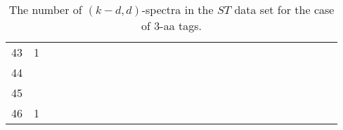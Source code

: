 \documentclass{article}
\begin{document}
\begin{table}[h]
{\begin{tabular}{|c|c|
c|c|c|c|c|c|c|c|c|c|c|c|c|c|c|c|c|c|c|c|c|c|c|c|c|c|}
43  & 1 &  &  &  &  &  &  &  &  &  &  &  &  &  &  &  &  &  &  &  &  &  &  &  &  &  & \\

44  &  &  &  &  &  &  &  &  &  &  &  &  &  &  &  &  &  &  &  &  &  &  &  &  &  &  & \\

45  &  &  &  &  &  &  &  &  &  &  &  &  &  &  &  &  &  &  &  &  &  &  &  &  &  &  & \\

46  & 1 &  &  &  &  &  &  &  &  &  &  &  &  &  &  &  &  &  &  &  &  &  &  &  &  &  & \\

  \hline
\end{tabular}
\par}
\centering
\caption{The number of $(k-d,d)$-spectra in the $ST$ data set for the case of 3-aa tags.}
\vspace{3mm}
\label{table:kd-1-ST}
\end{table}
\end{document}
